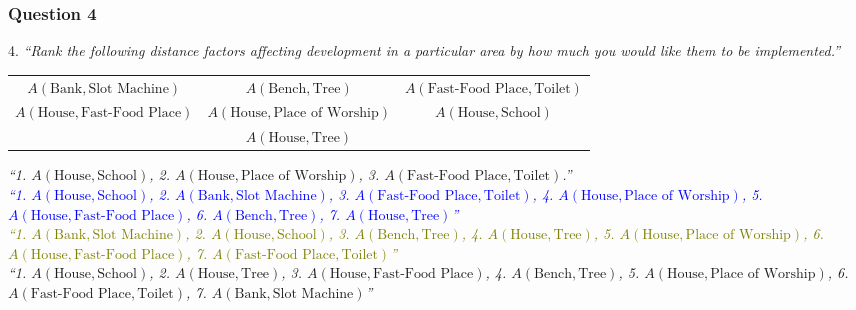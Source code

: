 \documentclass[12pt]{report}
\begin{document}
\subsubsection{Question 4}
4. \textit{``Rank the following distance factors affecting development in a particular area by how much you would like them to be implemented.''}
\begin{center}
\begin{tabular}{c c c}
    $A\left(\text{Bank},\text{Slot Machine}\right)$ & $A\left(\text{Bench},\text{Tree}\right)$ & $A\left(\text{Fast-Food Place},\text{Toilet}\right)$ \\
    $A\left(\text{House},\text{Fast-Food Place}\right)$ & $A\left(\text{House},\text{Place of Worship}\right)$ & $A\left(\text{House},\text{School}\right)$ \\
    \multicolumn{3}{c}{$A\left(\text{House},\text{Tree}\right)$}
\end{tabular}
\end{center}
\begin{flushright}
\textit{\textcolor{Sepia}{``1. $A\left(\text{House},\text{School}\right)$, 2. $A\left(\text{House},\text{Place of Worship}\right)$, 3. $A\left(\text{Fast-Food Place},\text{Toilet}\right)$.''}} \\
\textit{\textcolor{Blue}{``1. $A\left(\text{House},\text{School}\right)$, 2. $A\left(\text{Bank},\text{Slot Machine}\right)$, 3. $A\left(\text{Fast-Food Place},\text{Toilet}\right)$, 4. $A\left(\text{House},\text{Place of Worship}\right)$, 5. $A\left(\text{House},\text{Fast-Food Place}\right)$, 6. $A\left(\text{Bench},\text{Tree}\right)$, 7. $A\left(\text{House},\text{Tree}\right)$''}} \\
\textit{\textcolor{olive}{``1. $A\left(\text{Bank},\text{Slot Machine}\right)$, 2. $A\left(\text{House},\text{School}\right)$, 3. $A\left(\text{Bench},\text{Tree}\right)$, 4. $A\left(\text{House},\text{Tree}\right)$, 5. $A\left(\text{House},\text{Place of Worship}\right)$, 6. $A\left(\text{House},\text{Fast-Food Place}\right)$, 7. $A\left(\text{Fast-Food Place},\text{Toilet}\right)$''}} \\
\textit{\textcolor{OliveGreen}{``1. $A\left(\text{House},\text{School}\right)$, 2. $A\left(\text{House},\text{Tree}\right)$, 3. $A\left(\text{House},\text{Fast-Food Place}\right)$, 4. $A\left(\text{Bench},\text{Tree}\right)$, 5. $A\left(\text{House},\text{Place of Worship}\right)$, 6. $A\left(\text{Fast-Food Place},\text{Toilet}\right)$, 7. $A\left(\text{Bank},\text{Slot Machine}\right)$''}}
\end{flushright}
\end{document}
